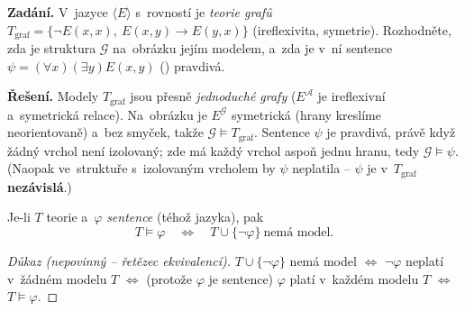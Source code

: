 \documentclass[11pt,a4paper]{article}
\begin{document}
\begin{priklad}
\textbf{Zadání.} V~jazyce $\langle E\rangle$ s~rovností je \emph{teorie grafů} $T_{\mathrm{graf}}=\{\neg E(x,x),\ E(x,y)\to E(y,x)\}$ (ireflexivita, symetrie). Rozhodněte, zda je struktura $\mathcal G$ na~obrázku jejím modelem, a~zda je v~ní sentence $\psi=(\forall x)(\exists y)E(x,y)$ () pravdivá.

\smallskip
\textbf{Řešení.} Modely $T_{\mathrm{graf}}$ jsou přesně \emph{jednoduché grafy} ($E^{\mathcal A}$ je ireflexivní a~symetrická relace). Na~obrázku je $E^{\mathcal G}$ symetrická (hrany kreslíme neorientovaně) a~bez smyček, takže $\mathcal G\models T_{\mathrm{graf}}$. Sentence $\psi$ je pravdivá, právě když žádný vrchol není izolovaný; zde má každý vrchol aspoň jednu hranu, tedy $\mathcal G\models\psi$. (Naopak ve~struktuře s~izolovaným vrcholem by $\psi$ neplatila -- $\psi$ je v~$T_{\mathrm{graf}}$ \textbf{nezávislá}.)

\smallskip
\begin{center}
\end{center}
\end{priklad}

\begin{veta}
Je-li $T$ teorie a~$\varphi$ \emph{sentence} (téhož jazyka), pak
\[
T\models\varphi\quad\Longleftrightarrow\quad T\cup\{\neg\varphi\}\ \text{nemá model.}
\]
\end{veta}

\begin{proof}[Důkaz \textnormal{(nepovinný -- řetězec ekvivalencí)}]
$T\cup\{\neg\varphi\}$ nemá model $\iff$ $\neg\varphi$ neplatí v~žádném modelu $T$ $\iff$ (protože $\varphi$ je sentence) $\varphi$ platí v~každém modelu $T$ $\iff$ $T\models\varphi$.
\end{proof}
\end{document}
